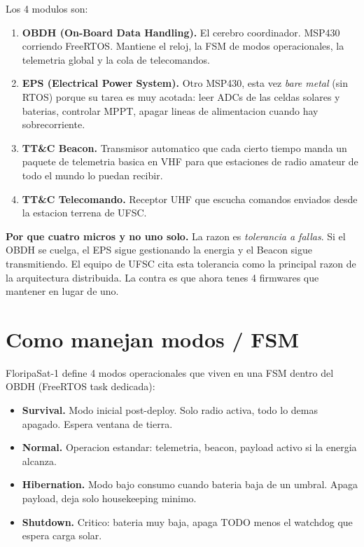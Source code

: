 \documentclass[11pt,a4paper,oneside,openright]{book}
\begin{document}
Los 4 modulos son:

\begin{enumerate}[leftmargin=2em]
  \item \textbf{OBDH (On-Board Data Handling).} El cerebro coordinador.
    MSP430 corriendo FreeRTOS. Mantiene el reloj, la FSM de modos
    operacionales, la telemetria global y la cola de telecomandos.
  \item \textbf{EPS (Electrical Power System).} Otro MSP430, esta vez
    \emph{bare metal} (sin RTOS) porque su tarea es muy acotada:
    leer ADCs de las celdas solares y baterias, controlar MPPT,
    apagar lineas de alimentacion cuando hay sobrecorriente.
  \item \textbf{TT\&C Beacon.} Transmisor automatico que cada cierto
    tiempo manda un paquete de telemetria basica en VHF para que
    estaciones de radio amateur de todo el mundo lo puedan recibir.
  \item \textbf{TT\&C Telecomando.} Receptor UHF que escucha
    comandos enviados desde la estacion terrena de UFSC.
\end{enumerate}

\begin{tecnico}
\textbf{Por que cuatro micros y no uno solo.} La razon es \emph{tolerancia
a fallas}. Si el OBDH se cuelga, el EPS sigue gestionando la energia y
el Beacon sigue transmitiendo. El equipo de UFSC cita esta tolerancia
como la principal razon de la arquitectura distribuida. La contra es
que ahora tenes 4 firmwares que mantener en lugar de uno.
\end{tecnico}

\section{Como manejan modos / FSM}

FloripaSat-1 define 4 modos operacionales que viven en una FSM dentro
del OBDH (FreeRTOS task dedicada):

\begin{itemize}[leftmargin=2em]
  \item \textbf{Survival.} Modo inicial post-deploy. Solo radio
    activa, todo lo demas apagado. Espera ventana de tierra.
  \item \textbf{Normal.} Operacion estandar: telemetria, beacon,
    payload activo si la energia alcanza.
  \item \textbf{Hibernation.} Modo bajo consumo cuando bateria baja
    de un umbral. Apaga payload, deja solo housekeeping minimo.
  \item \textbf{Shutdown.} Critico: bateria muy baja, apaga TODO menos
    el watchdog que espera carga solar.
\end{itemize}
\end{document}
